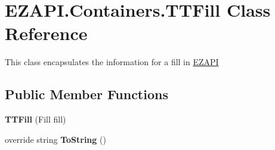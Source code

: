 \hypertarget{class_e_z_a_p_i_1_1_containers_1_1_t_t_fill}{\section{E\-Z\-A\-P\-I.\-Containers.\-T\-T\-Fill Class Reference}
\label{class_e_z_a_p_i_1_1_containers_1_1_t_t_fill}
}


This class encapsulates the information for a fill in \hyperlink{namespace_e_z_a_p_i}{E\-Z\-A\-P\-I}  


\subsection*{Public Member Functions}
\begin{DoxyCompactItemize}
\item 
\hypertarget{class_e_z_a_p_i_1_1_containers_1_1_t_t_fill_a75b7ba3c2c45c50d37533e8167abbb4d}{{\bfseries T\-T\-Fill} (Fill fill)}\label{class_e_z_a_p_i_1_1_containers_1_1_t_t_fill_a75b7ba3c2c45c50d37533e8167abbb4d}

\item 
\hypertarget{class_e_z_a_p_i_1_1_containers_1_1_t_t_fill_a23483aa5c2463aa375e807ac812be01b}{override string {\bfseries To\-String} ()}\label{class_e_z_a_p_i_1_1_containers_1_1_t_t_fill_a23483aa5c2463aa375e807ac812be01b}

\end{DoxyCompactItemize}
